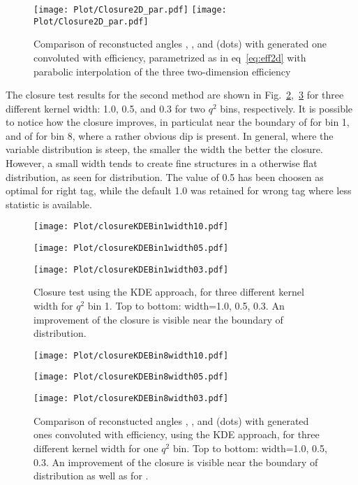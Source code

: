 \begin{figure}[hbt]
    \texttt{[image: Plot/Closure2D\_par.pdf]}
    \texttt{[image: Plot/Closure2D\_par.pdf]}
    \caption{Comparison of reconstucted angles \TK, \TL, and \PHI (dots) with generated one convoluted with efficiency, parametrized as in eq~\ref{eq:eff2d} with parabolic interpolation of the three two-dimension efficiency}
    \label{fig:clEff2Dpar}
\end{figure}

The closure test results for the second method are shown in
Fig.~\ref{fig:clKDEwidthBin1},~\ref{fig:clKDEwidthBin8} for three
different kernel width: 1.0, 0.5, and 0.3 for two $q^2$ bins,
respectively. It is possible to notice how the closure improves, in
particulat near the boundary of \TK for bin 1, and of \PHI for bin 8,
where a rather obvious dip is present.  In general, where the variable
distribution is steep, the smaller the width the better the closure.
However, a small width tends to create fine structures in a otherwise
flat distribution, as seen for \PHI distribution.  The value of 0.5
has been choosen as optimal for right tag, while the default 1.0 was
retained for wrong tag where less statistic is available.

\begin{figure}[hbt]
    \texttt{[image: Plot/closureKDEBin1width10.pdf]}

    \texttt{[image: Plot/closureKDEBin1width05.pdf]}

    \texttt{[image: Plot/closureKDEBin1width03.pdf]}

    \caption{Closure test using the KDE approach, for three different kernel
        width for $q^2$ bin 1. Top to bottom: width=1.0, 0.5, 0.3.
        An improvement of the closure is visible near the boundary of \cTK distribution.}
    \label{fig:clKDEwidthBin1}
\end{figure}

\begin{figure}[hbt]
    \texttt{[image: Plot/closureKDEBin8width10.pdf]}

    \texttt{[image: Plot/closureKDEBin8width05.pdf]}

    \texttt{[image: Plot/closureKDEBin8width03.pdf]}

    \caption{Comparison of reconstucted angles \TK, \TL, and \PHI (dots) with
        generated ones convoluted with efficiency, using the KDE approach, for
        three different kernel width for one $q^2$ bin. Top to bottom: width=1.0, 0.5, 0.3.
        An improvement of the closure is visible near the boundary of \cTK distribution as well as for \PHI.}
    \label{fig:clKDEwidthBin8}
\end{figure}

